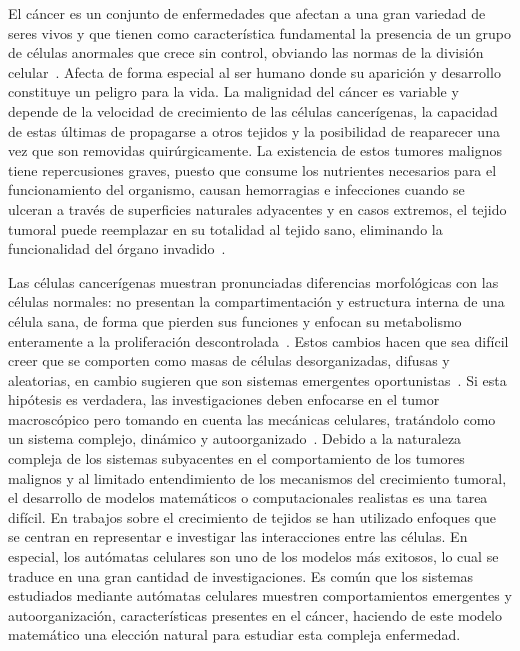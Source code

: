 El c\'ancer es un conjunto de enfermedades que afectan a una gran variedad de seres vivos y que tienen como caracter\'istica fundamental la presencia de un grupo de c\'elulas anormales que crece sin control, obviando las normas de la divisi\'on celular~\cite{robins}. Afecta de forma especial al ser humano donde su aparici\'on y desarrollo constituye un peligro para la vida. La malignidad del c\'ancer es variable y depende de la velocidad de crecimiento de las c\'elulas cancer\'igenas, la capacidad de estas \'ultimas de propagarse a otros tejidos y la posibilidad de reaparecer una vez que son removidas quir\'urgicamente. La existencia de estos tumores malignos tiene repercusiones graves, puesto que consume los nutrientes necesarios para el funcionamiento del organismo, causan hemorragias e infecciones cuando se ulceran a trav\'es de superficies naturales adyacentes y en casos extremos, el tejido tumoral puede reemplazar en su totalidad al tejido sano, eliminando la funcionalidad del \'organo invadido~\cite{robins}.

Las c\'elulas cancer\'igenas muestran pronunciadas diferencias morfol\'ogicas con las c\'elulas normales: no presentan la compartimentaci\'on y estructura interna de una c\'elula sana, de forma que pierden sus funciones y enfocan su metabolismo enteramente a la proliferaci\'on descontrolada~\cite{oportunism}. Estos cambios hacen que sea dif\'icil creer que se comporten como masas de c\'elulas desorganizadas, difusas y aleatorias, en cambio sugieren que son sistemas emergentes oportunistas~\cite{oportunism}. Si esta hip\'otesis es verdadera, las investigaciones deben enfocarse en el tumor macrosc\'opico pero tomando en cuenta las mec\'anicas celulares, trat\'andolo como un sistema complejo, din\'amico y autoorganizado~\cite{kansal}. Debido a la naturaleza compleja de los sistemas subyacentes en el comportamiento de los tumores malignos y al limitado entendimiento de los mecanismos del crecimiento tumoral, el desarrollo de modelos matem\'aticos o computacionales realistas es una tarea dif\'icil. En trabajos sobre el crecimiento de tejidos se han utilizado enfoques que se centran en representar e investigar las interacciones entre las c\'elulas. En especial, los aut\'omatas celulares son uno de los modelos m\'as exitosos, lo cual se traduce en una gran cantidad de investigaciones. Es com\'un que los sistemas estudiados mediante aut\'omatas celulares muestren comportamientos emergentes y autoorganizaci\'on, caracter\'isticas presentes en el c\'ancer, haciendo de este modelo matem\'atico una elecci\'on natural para estudiar esta compleja enfermedad.

